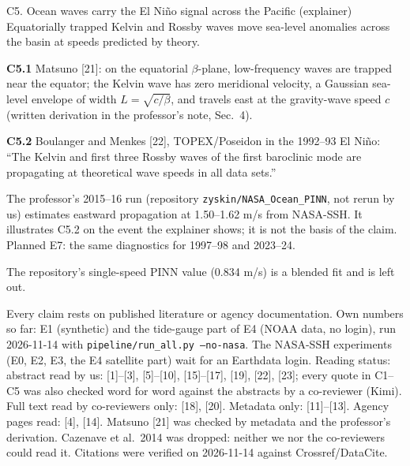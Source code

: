 \documentclass[10pt]{article}
\begin{document}
\begin{claimbox}{C5. Ocean waves carry the El Ni\~no signal across the Pacific (explainer)}
Equatorially trapped Kelvin and Rossby waves move sea-level anomalies across the basin at speeds predicted by theory.
\end{claimbox}
\begin{thbox}
\textbf{C5.1} Matsuno [21]: on the equatorial $\beta$-plane, low-frequency waves are trapped near the equator; the Kelvin wave has zero
meridional velocity, a Gaussian sea-level envelope of width $L=\sqrt{c/\beta}$, and travels east at the gravity-wave speed $c$
(written derivation in the professor's note, Sec.~4).
\end{thbox}
\begin{libox}
\textbf{C5.2} Boulanger and Menkes [22], TOPEX/Poseidon in the 1992--93 El Ni\~no: ``The Kelvin and first three Rossby waves of the first baroclinic mode
are propagating at theoretical wave speeds in all data sets.''
\end{libox}
\begin{nubox}
The professor's 2015--16 run (repository \texttt{zyskin/NASA\_Ocean\_PINN}, not rerun by us) estimates eastward propagation at 1.50--1.62 m/s from
NASA-SSH. It illustrates C5.2 on the event the explainer shows; it is not the basis of the claim. Planned E7: the same diagnostics for
1997--98 and 2023--24.
\end{nubox}
\begin{cabox}
The repository's single-speed PINN value (0.834 m/s) is a blended fit and is left out.
\end{cabox}

\begin{cabox}
Every claim rests on published literature or agency documentation. Own numbers so far: E1 (synthetic) and the tide-gauge part of E4
(NOAA data, no login), run 2026-11-14 with \texttt{pipeline/run\_all.py --no-nasa}. The NASA-SSH experiments (E0, E2, E3, the E4 satellite
part) wait for an Earthdata login. Reading status: abstract read by us: [1]--[3], [5]--[10], [15]--[17], [19], [22], [23]; every quote in
C1--C5 was also checked word for word against the abstracts by a co-reviewer (Kimi). Full text read by co-reviewers only: [18], [20].
Metadata only: [11]--[13]. Agency pages read: [4], [14]. Matsuno [21] was checked by metadata and the professor's derivation. Cazenave
et al.\ 2014 was dropped: neither we nor the co-reviewers could read it. Citations were verified on 2026-11-14 against Crossref/DataCite.
\end{cabox}
\end{document}
